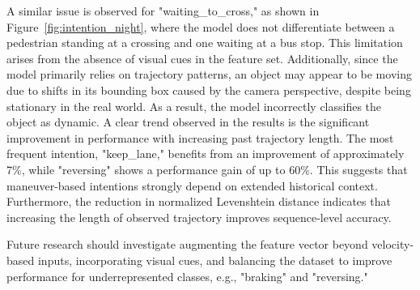 A similar issue is observed for "waiting\_to\_cross," as shown in Figure~\ref{fig:intention_night}, where the model does not differentiate between a pedestrian standing at a crossing and one waiting at a bus stop. This limitation arises from the absence of visual cues in the feature set. Additionally, since the model primarily relies on trajectory patterns, an object may appear to be moving due to shifts in its bounding box caused by the camera perspective, despite being stationary in the real world. As a result, the model incorrectly classifies the object as dynamic. A clear trend observed in the results is the significant improvement in performance with increasing past trajectory length. The most frequent intention, "keep\_lane," benefits from an improvement of approximately 7\%, while "reversing" shows a performance gain of up to 60\%. This suggests that maneuver-based intentions strongly depend on extended historical context. Furthermore, the reduction in normalized Levenshtein distance indicates that increasing the length of observed trajectory improves sequence-level accuracy.

Future research should investigate augmenting the feature vector beyond velocity-based inputs, incorporating visual cues, and balancing the dataset to improve performance for underrepresented classes, e.g., "braking" and "reversing."



